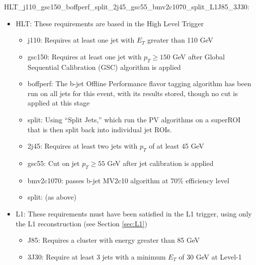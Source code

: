         HLT\_j110\_gsc150\_boffperf\_split\_2j45\_gsc55\_bmv2c1070\_split\_L1J85\_3J30:
        \begin{itemize}
            \item HLT: These requirements are based in the High Level Trigger
                \begin{itemize}
                \item j110: Requires at least one jet with $E_T$ greater than 110 GeV
                \item gsc150: Requires at least one jet with $p_T \geq 150$ GeV after Global Sequential Calibration (GSC) algorithm is applied
                \item boffperf: The b-jet Offline Performance flavor tagging algorithm has been run on all jets for this event,
                    with its results stored, though no cut is applied at this stage
                \item split: Using ``Split Jets,'' which run the PV algorithms on a superROI
                    that is then split back into individual jet ROIs.
                \item 2j45: Requires at least two jets with $p_T$ of at least 45 GeV
                \item gsc55: Cut on jet $p_T \geq 55$ GeV after jet calibration is applied
                \item bmv2c1070: passes b-jet MV2c10 algorithm at 70\% efficiency level
                \item split: (as above)
            \end{itemize}
            \item L1: These requirements must have been satisfied in the L1 trigger,
                using only the L1 reconstruction (see Section \ref{sec:L1})
                \begin{itemize}
                \item J85: Requires a cluster with energy greater than 85 GeV
                \item 3J30: Require at least 3 jets with a minimum $E_T$ of 30 GeV at Level-1
            \end{itemize}
        \end{itemize}


        

